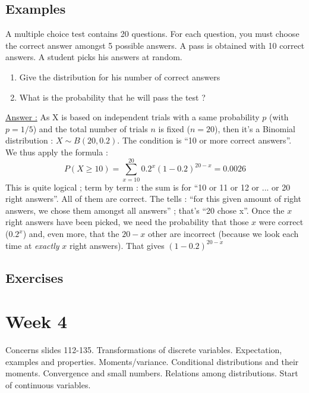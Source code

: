 \documentclass[12pt,a4paper]{article}
\begin{document}
\subsection{Examples}
 A multiple choice test contains 20 questions. For each question, you must choose the correct answer amongst 5 possible answers. A pass is obtained with 10 correct answers. A student picks his answers at random. 
\begin{enumerate}
    \item Give the distribution for his number of correct answers
    \item What is the probability that he will pass the test ?
\end{enumerate}
\uline{Answer :} As X is based on independent trials with a same probability $p$ (with $p = 1/5$) and the total number of trials $n$ is fixed ($n = 20$), then it's a Binomial distribution : $X \sim B(20, 0.2)$. The condition is ``10 or more correct answers''. We thus apply the formula :
\[P(X \geq 10) = \sum_{x=10}^{20}0.2^x(1-0.2)^{20-x} = 0.0026\]
This is quite logical ; term by term : the sum is for ``10 or 11 or 12 or ... or 20 right answers''. All of them are correct. The  tells : ``for this given amount of right answers, we chose them amongst all answers'' ; that's ``20 chose x''. Once the $x$ right answers have been picked, we need the probability that those $x$ were correct ($0.2^x$) and, even more, that the $20-x$ other are incorrect (because we look each time at \textit{exactly} $x$ right answers). That gives $(1-0.2)^{20-x}$
\subsection{Exercises}


\section{Week 4}
Concerns slides 112-135. Transformations of discrete variables. Expectation, examples and properties. Moments/variance. Conditional distributions and their moments. Convergence and small numbers. Relations among distributions. Start of continuous variables.
\end{document}
